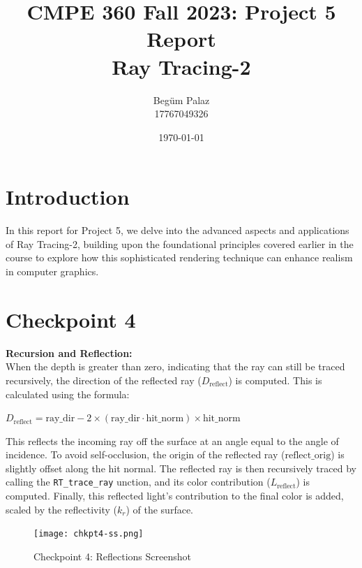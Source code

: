 \documentclass[a4paper]{report}
\title{CMPE 360 Fall 2023: Project 5 Report \\ Ray Tracing-2}
\author{Begüm Palaz \\ 17767049326}
\date{\today}
\begin{document}
\maketitle

\section*{Introduction}
In this report for Project 5, we delve into the advanced aspects and applications of Ray Tracing-2, building upon the foundational principles covered earlier in the course to explore how this sophisticated rendering technique can enhance realism in computer graphics.

\section*{Checkpoint 4}

\textbf{Recursion and Reflection:} \\

When the depth is greater than zero, indicating that the ray can still be traced recursively, the direction of the reflected ray ($D_{\text{reflect}}$) is computed. This is calculated using the formula: \\
\begin{center}
    $D_{\text{reflect}} = \text{ray\_dir} - 2 \times (\text{ray\_dir} \cdot \text{hit\_norm}) \times \text{hit\_norm}$ \\
\end{center}

This reflects the incoming ray off the surface at an angle equal to the angle of incidence.
To avoid self-occlusion, the origin of the reflected ray ($\text{reflect\_orig}$) is slightly offset along the hit normal.
The reflected ray is then recursively traced by calling the  \texttt{RT\_trace\_ray} unction, and its color contribution ($L_{\text{reflect}}$) is computed.
Finally, this reflected light's contribution to the final color is added, scaled by the reflectivity ($k_r$) of the surface.

\begin{figure}[H]
    \begin{adjustbox}{lap=-1.5cm}
        \texttt{[image: chkpt4-ss.png]}
    \end{adjustbox}
    \caption{Checkpoint 4: Reflections Screenshot}
    \label{fig:chkpt-ss}
\end{figure}
\end{document}
